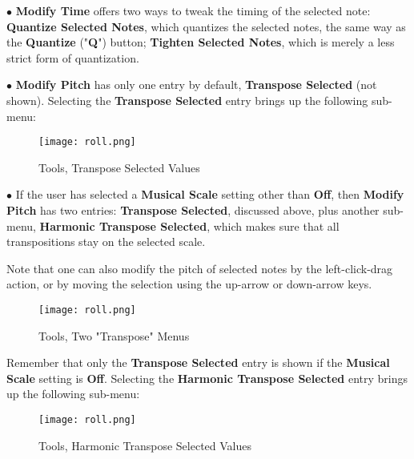    $\bullet$ \textbf{Modify Time} offers two ways to tweak the timing of the
   selected note:
   \textbf{Quantize Selected Notes}, which quantizes the selected
   notes, the same way as the \textbf{Quantize} ("\textbf{Q}") button;
   \textbf{Tighten Selected Notes}, which is merely a less
   strict form of quantization.

   $\bullet$ \textbf{Modify Pitch} has only one entry by default,
   \textbf{Transpose Selected} (not shown).
   Selecting the \textbf{Transpose Selected} entry
   brings up the following sub-menu:

\begin{figure}[H]
   \centering 
   \texttt{[image: roll.png]}
   \caption{Tools, Transpose Selected Values}
   \label{fig:pattern_editor_tools_transpose_selected_menu}
\end{figure}

   $\bullet$ If the user has selected a
   \textbf{Musical Scale} setting other than \textbf{Off},
   then \textbf{Modify Pitch} has two entries:
   \textbf{Transpose Selected}, discussed above, plus
   another sub-menu,
   \textbf{Harmonic Transpose Selected}, which makes sure that all
   transpositions stay on the selected scale.

   Note that one can also modify the pitch of selected notes by the
   left-click-drag action, or by moving the selection using the
   up-arrow or down-arrow keys.

\begin{figure}[H]
   \centering 
   \texttt{[image: roll.png]}
   \caption{Tools, Two "Transpose" Menus}
   \label{fig:pattern_editor_tools_two_transpose_menus}
\end{figure}

   Remember that only the \textbf{Transpose Selected} entry is shown if the
   \textbf{Musical Scale} setting is \textbf{Off}.
   Selecting the \textbf{Harmonic Transpose Selected} entry brings up the
   following sub-menu:

\begin{figure}[H]
   \centering 
   \texttt{[image: roll.png]}
   \caption{Tools, Harmonic Transpose Selected Values}
   \label{fig:pattern_editor_tools_harmonic_transpose_menu}
\end{figure}

